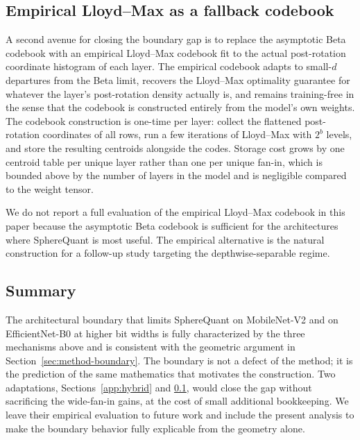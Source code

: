 \subsection{Empirical Lloyd--Max as a fallback codebook}
\label{app:empirical-lloyd}

A second avenue for closing the boundary gap is to replace the
asymptotic Beta codebook with an empirical Lloyd--Max codebook fit to
the actual post-rotation coordinate histogram of each layer. The
empirical codebook adapts to small-$d$ departures from the Beta limit,
recovers the Lloyd--Max optimality guarantee for whatever the layer's
post-rotation density actually is, and remains training-free in the
sense that the codebook is constructed entirely from the model's own
weights. The codebook construction is one-time per layer: collect the
flattened post-rotation coordinates of all rows, run a few iterations
of Lloyd--Max with $2^b$ levels, and store the resulting centroids
alongside the codes. Storage cost grows by one centroid table per
unique layer rather than one per unique fan-in, which is bounded above
by the number of layers in the model and is negligible compared to
the weight tensor.

We do not report a full evaluation of the empirical Lloyd--Max
codebook in this paper because the asymptotic Beta codebook is
sufficient for the architectures where SphereQuant is most useful. The
empirical alternative is the natural construction for a follow-up
study targeting the depthwise-separable regime.

\subsection{Summary}

The architectural boundary that limits SphereQuant on MobileNet-V2 and
on EfficientNet-B0 at higher bit widths is fully characterized by the
three mechanisms above and is consistent with the geometric argument
in Section~\ref{sec:method-boundary}. The boundary is not a defect of
the method; it is the prediction of the same mathematics that
motivates the construction. Two adaptations,
Sections~\ref{app:hybrid} and \ref{app:empirical-lloyd}, would close
the gap without sacrificing the wide-fan-in gains, at the cost of
small additional bookkeeping. We leave their empirical evaluation to
future work and include the present analysis to make the boundary
behavior fully explicable from the geometry alone.
